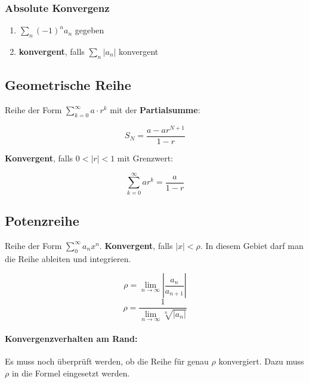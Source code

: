 \documentclass[11pt]{article}
\begin{document}
\subsubsection*{Absolute Konvergenz}

\begin{enumerate}
	\item $\sum_n (-1)^n a_n$ gegeben
	\item \textbf{konvergent}, falls $\sum_n |a_n|$ konvergent
\end{enumerate}

\subsection{Geometrische Reihe}

Reihe der Form $\sum^\infty_{k = 0} a \cdot r^k$ mit der \textbf{Partialsumme}:

\begin{equation*}
	S_N=\frac{a-ar^{N+1}}{1-r}
\end{equation*}

\textbf{Konvergent}, falls $0<|r|<1$ mit Grenzwert:

\begin{equation*}
	\sum^\infty_{k=0}ar^k=\frac{a}{1-r}
\end{equation*}

\subsection{Potenzreihe}

Reihe der Form $\sum^\infty_0 a_nx^n$. \textbf{Konvergent}, falls $|x|<\rho$. In diesem Gebiet darf man die Reihe ableiten und integrieren.

\begin{equation*}
	\rho= \lim_{n\rightarrow \infty}|\frac{a_n}{a_{n+1}}|
\end{equation*}
\begin{equation*}
	\rho=\frac{1}{\lim_{n\rightarrow \infty}\sqrt[n]{|a_n|}}
\end{equation*}

\paragraph{Konvergenzverhalten am Rand:} Es muss noch {\"u}berpr{\"u}ft werden, ob die Reihe f{\"u}r genau $\rho$ konvergiert. Dazu muss $\rho$ in die Formel eingesetzt werden.
\end{document}
